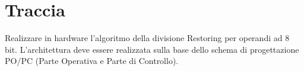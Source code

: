 %

\section{Traccia}

Realizzare in hardware l\textquoteright algoritmo della divisione
Restoring per operandi ad 8 bit. L\textquoteright architettura deve
essere realizzata sulla base dello schema di progettazione PO/PC (Parte
Operativa e Parte di Controllo).%

